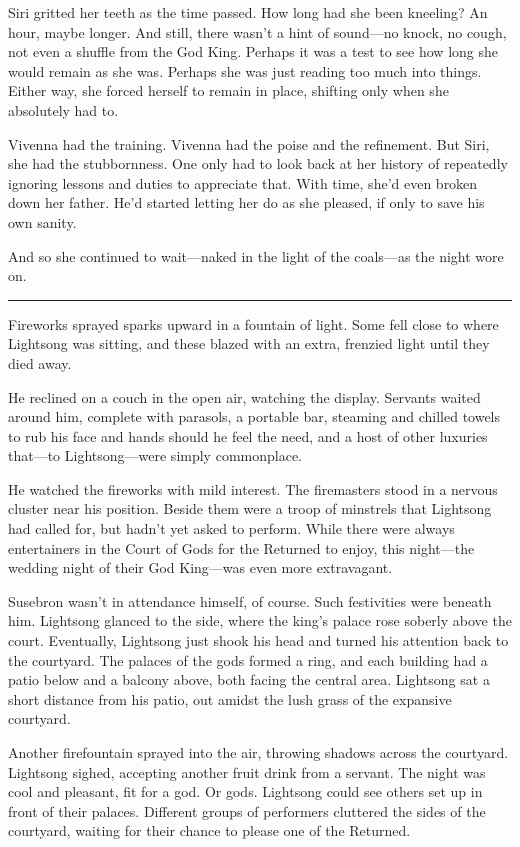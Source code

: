 Siri gritted her teeth as the time passed. How long had she been kneeling? An hour, maybe longer. And still, there wasn’t a hint of sound—no knock, no cough, not even a shuffle from the God King. Perhaps it was a test to see how long she would remain as she was. Perhaps she was just reading too much into things. Either way, she forced herself to remain in place, shifting only when she absolutely had to.

Vivenna had the training. Vivenna had the poise and the refinement. But Siri, she had the stubbornness. One only had to look back at her history of repeatedly ignoring lessons and duties to appreciate that. With time, she’d even broken down her father. He’d started letting her do as she pleased, if only to save his own sanity.

And so she continued to wait—naked in the light of the coals—as the night wore on.

\bigskip \hrule \bigskip

Fireworks sprayed sparks upward in a fountain of light. Some fell close to where Lightsong was sitting, and these blazed with an extra, frenzied light until they died away.

He reclined on a couch in the open air, watching the display. Servants waited around him, complete with parasols, a portable bar, steaming and chilled towels to rub his face and hands should he feel the need, and a host of other luxuries that—to Lightsong—were simply commonplace.

He watched the fireworks with mild interest. The firemasters stood in a nervous cluster near his position. Beside them were a troop of minstrels that Lightsong had called for, but hadn’t yet asked to perform. While there were always entertainers in the Court of Gods for the Returned to enjoy, this night—the wedding night of their God King—was even more extravagant.

Susebron wasn’t in attendance himself, of course. Such festivities were beneath him. Lightsong glanced to the side, where the king’s palace rose soberly above the court. Eventually, Lightsong just shook his head and turned his attention back to the courtyard. The palaces of the gods formed a ring, and each building had a patio below and a balcony above, both facing the central area. Lightsong sat a short distance from his patio, out amidst the lush grass of the expansive courtyard.

Another firefountain sprayed into the air, throwing shadows across the courtyard. Lightsong sighed, accepting another fruit drink from a servant. The night was cool and pleasant, fit for a god. Or gods. Lightsong could see others set up in front of their palaces. Different groups of performers cluttered the sides of the courtyard, waiting for their chance to please one of the Returned.

